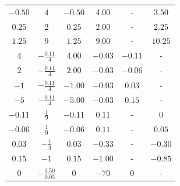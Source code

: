 \documentclass[
	spanish,
	8pt,
	utf8,
	xcolor=table,
	handout,
	aspectratio=169,
	professionalfonts,
	mathserif,
	leqno,
]{beamer}
\begin{document}
\begin{frame}
\begin{minipage}{0.6\textwidth}
\begin{table}[ht!]
\begin{tabular}{|cccccc|}
				$-0.50$                                                                                               & $4$                               & $-0.50$ & $4.00$  & -       & $3.50$  \\
				$0.25$                                                                                                & $2$                               & $0.25$  & $2.00$  & -       & $2.25$  \\
				$1.25$                                                                                                & $9$                               & $1.25$  & $9.00$  & -       & $10.25$ \\
				$4$                                                                                                   & $-\tfrac{0.11}{4}$                & $4.00$  & $-0.03$ & $-0.11$ & -       \\
				$2$                                                                                                   & $-\tfrac{0.11}{4}$                & $2.00$  & $-0.03$ & $-0.06$ & -       \\
				$-1$                                                                                                  & $-\tfrac{0.11}{4}$                & $-1.00$ & $-0.03$ & $0.03$  & -       \\
				$-5$                                                                                                  & $-\tfrac{0.11}{4}$                & $-5.00$ & $-0.03$ & $0.15$  & -       \\
				$-0.11$                                                                                               & $\tfrac{1}{9}$                    & $-0.11$ & $0.11$  & -       & $0$     \\
				$-0.06$                                                                                               & $\tfrac{1}{9}$                    & $-0.06$ & $0.11$  & -       & $0.05$  \\
				$0.03$                                                                                                & $-\tfrac{1}{3}$                   & $0.03$  & $-0.33$ & -       & $-0.30$ \\
				$0.15$                                                                                                & $-1$                              & $0.15$  & $-1.00$ & -       & $-0.85$ \\
				$0$                                                                                                   & $-\tfrac{3.50}{0.05}$             & $0$     & $-70$   & $0$     & -       \\

\end{tabular}
\end{table}
\end{minipage}
\end{frame}
\end{document}
